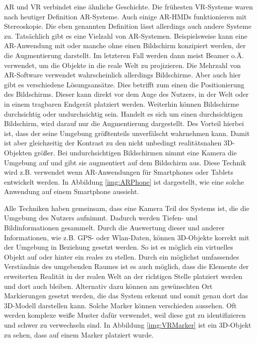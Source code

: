 AR und VR verbindet eine ähnliche Geschichte. Die frühesten VR-Systeme waren nach heutiger Definition AR-Systeme.
Auch einige AR-HMDs funktionieren mit Stereoskopie. Die eben genannten Definition lässt allerdings auch andere Systeme zu. Tatsächlich gibt es eine Vielzahl von AR-Systemen. 
Beispielsweise kann eine AR-Anwendung mit oder manche ohne einen Bildschirm konzipiert werden, der die Augmentierung darstellt. Im letzteren Fall werden dann meist Beamer o.Ä. verwendet, um die Objekte in die reale Welt zu projizieren. 
Die Mehrzahl von AR-Software verwendet wahrscheinlich allerdings Bildschirme. %
Aber auch hier gibt es verschiedene Lösungsansätze. Dies betrifft zum einen die Positionierung des Bildschirms. Dieser kann direkt vor dem Auge des Nutzers, in der Welt oder in einem tragbaren Endgerät platziert werden.
Weiterhin können Bildschirme durchsichtig oder undurchsichtig sein. Handelt es sich um einen durchsichtigen Bildschirm, wird darauf nur die Augmentierung dargestellt. Des Vorteil hierbei ist, dass der seine Umgebung größtenteils unverfälscht wahrnehmen kann. Damit ist aber gleichzeitig der Kontrast zu den nicht unbedingt realitätsnahen 3D-Objekten größer.
Bei undurchsichtigen Bildschirmen nimmt eine Kamera die Umgebung auf und gibt sie augmentiert auf dem Bildschirm aus. Diese Technik wird z.B. verwendet wenn AR-Anwendungen für Smartphones oder Tablets entwickelt werden. In Abbildung \ref{img:ARPhone} ist dargestellt, wie eine solche Anwendung auf einem Smartphone aussieht.


Alle Techniken haben gemeinsam, dass eine Kamera Teil des Systems ist, die die Umgebung des Nutzers aufnimmt. Dadurch werden Tiefen- und Bildinformationen gesammelt. Durch die Auswertung dieser und anderer Informationen, wie z.B. GPS- oder Wlan-Daten, können 3D-Objekte korrekt mit der Umgebung in Beziehung gesetzt werden. So ist es möglich ein virtuelles Objekt auf oder hinter ein reales zu stellen. Durch ein möglichst umfassendes Verständnis des umgebenden Raumes ist es auch möglich, dass die Elemente der erweiterten Realität in der realen Welt an der richtigen Stelle platziert werden und dort auch bleiben.
Alternativ dazu können am gewünschten Ort Markierungen gesetzt werden, die das System erkennt und somit genau dort das 3D-Modell darstellen kann. Solche Marker können verschieden aussehen. Oft werden komplexe weiße Muster dafür verwendet, weil diese gut zu identifizieren und schwer zu verwechseln sind. In Abbildung \ref{img:VRMarker} ist ein 3D-Objekt zu sehen, dass auf einem Marker platziert wurde. 

